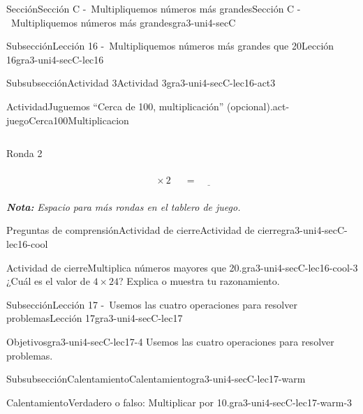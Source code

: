 \documentclass[twoside,10pt,]{article}
\newcommand{\alert}[1]{\textbf{\textit{#1}}}
\begin{document}
\begin{sectionptx}{Sección}{Sección C -~Multipliquemos números más grandes}{}{Sección C -~Multipliquemos números más grandes}{}{}{gra3-uni4-secC}
\begin{subsectionptx}{Subsección}{Lección 16 -~Multipliquemos números más grandes que 20}{}{Lección 16}{}{}{gra3-uni4-secC-lec16}
\begin{subsubsectionptx}{Subsubsección}{Actividad 3}{}{Actividad 3}{}{}{gra3-uni4-secC-lec16-act3}
\begin{activity}{Actividad}{Juguemos “Cerca de 100, multiplicación” (opcional).}{act-juegoCerca100Multiplicacion}
\begin{sidebyside}{2}{0}{0}{0.1}
\begin{sbspanel}{0.45}
\begin{equation*}
\end{equation*}
%
\end{sbspanel}%
\begin{sbspanel}{0.45}%
Ronda 2%
\par
%
\begin{equation*}
\boxed{\phantom{\frac{00}{00}}} \times 2 \ \boxed{\phantom{\frac{00}{00}}}= \underline{\hspace{1cm}}
\end{equation*}
%
\end{sbspanel}%
\end{sidebyside}%
\alert{Nota:} \emph{Espacio para más rondas en el tablero de juego.}%
\end{activity}%
\end{subsubsectionptx}
%
%
\typeout{************************************************}
\typeout{************************************************}
%
\begin{reading-questions-subsubsection}{Preguntas de comprensión}{Actividad de cierre}{}{Actividad de cierre}{}{}{gra3-uni4-secC-lec16-cool}
\begin{project}{Actividad de cierre}{Multiplica números mayores que 20.}{gra3-uni4-secC-lec16-cool-3}%
¿Cuál es el valor de \(4\times 24\)? Explica o muestra tu razonamiento.%
\end{project}%
\end{reading-questions-subsubsection}
\end{subsectionptx}
%
%
\typeout{************************************************}
\typeout{************************************************}
%
\begin{subsectionptx}{Subsección}{Lección 17 -~Usemos las cuatro operaciones para resolver problemas}{}{Lección 17}{}{}{gra3-uni4-secC-lec17}
\begin{objectives}{Objetivos}{gra3-uni4-secC-lec17-4}
Usemos las cuatro operaciones para resolver problemas.%
\end{objectives}
%
%
\typeout{************************************************}
\typeout{************************************************}
%
\begin{subsubsectionptx}{Subsubsección}{Calentamiento}{}{Calentamiento}{}{}{gra3-uni4-secC-lec17-warm}
\begin{exploration}{Calentamiento}{Verdadero o falso: Multiplicar por 10.}{gra3-uni4-secC-lec17-warm-3}%

\end{exploration}
\end{subsubsectionptx}
\end{subsectionptx}
\end{sectionptx}
\end{document}
